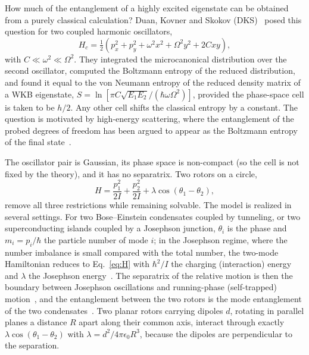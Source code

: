 \documentclass[pra,twocolumn,superscriptaddress,longbibliography,floatfix]{revtex4-2}
\begin{document}
How much of the entanglement of a highly excited eigenstate can be obtained from
a purely classical calculation? Duan, Kovner and Skokov (DKS)~\cite{DKS} posed
this question for two coupled harmonic oscillators,
\begin{equation}
H_{c}=\tfrac12\left(p_{x}^{2}+p_{y}^{2}+\omega^{2}x^{2}+\Omega^{2}y^{2}
+2Cxy\right),
\label{eq:DKS}
\end{equation}
with $C\ll\omega^{2}\ll\Omega^{2}$. They integrated the microcanonical
distribution over the second oscillator, computed the Boltzmann entropy of the
reduced distribution, and found it equal to the von Neumann entropy of the
reduced density matrix of a WKB eigenstate,
$S=\ln[\pi C\sqrt{E_{1}E_{2}}/(\hbar\omega\Omega^{2})]$, provided the
phase-space cell is taken to be $h/2$. Any other cell shifts the classical
entropy by a constant. The question is motivated by high-energy scattering, where
the entanglement of the probed degrees of freedom has been argued to appear as
the Boltzmann entropy of the final state~\cite{KharzeevLevin,Kutak,Hagiwara}.

The oscillator pair is Gaussian, its phase space is non-compact (so the cell is
not fixed by the theory), and it has no separatrix. Two rotors on a circle,
\begin{equation}
H=\frac{p_{1}^{2}}{2I}+\frac{p_{2}^{2}}{2I}
+\lambda\cos\left(\theta_{1}-\theta_{2}\right),
\label{eq:H}
\end{equation}
remove all three restrictions while remaining solvable. The model is realized in
several settings. For two Bose--Einstein condensates coupled by tunneling, or two
superconducting islands coupled by a Josephson junction, $\theta_{i}$ is the
phase and $m_{i}=p_{i}/\hbar$ the particle number of mode $i$; in the Josephson
regime, where the number imbalance is small compared with the total number,
the two-mode Hamiltonian reduces to Eq.~\eqref{eq:H} with
$\hbar^{2}/I$ the charging (interaction) energy and $\lambda$ the Josephson
energy~\cite{Smerzi97,Raghavan99,GatiOberthaler,FazioReview}. The separatrix of
the relative motion is then the boundary between Josephson oscillations and
running-phase (self-trapped) motion~\cite{Smerzi97,Raghavan99,Albiez05}, and the
entanglement between the two rotors is the mode entanglement of the two
condensates~\cite{Hines03}. Two planar rotors carrying dipoles $d$, rotating in
parallel planes a distance $R$ apart along their common axis, interact through
exactly $\lambda\cos(\theta_{1}-\theta_{2})$ with $\lambda=d^{2}/4\pi\epsilon_{0}R^{3}$,
because the dipoles are perpendicular to the separation.
\end{document}
